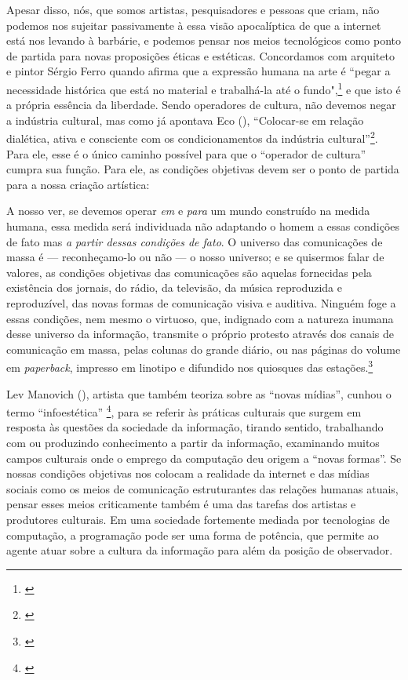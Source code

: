Apesar disso, nós, que somos artistas, pesquisadores e pessoas que criam, não podemos nos sujeitar passivamente à essa visão apocalíptica de que a internet está nos levando à barbárie, e podemos pensar nos meios tecnológicos como ponto de partida para novas proposições éticas e estéticas. Concordamos com arquiteto e pintor Sérgio Ferro quando afirma que a expressão humana na arte é ``pegar a necessidade histórica que está no material e trabalhá-la até o fundo",\footnote{\cite{FerroSergio2002}} e que isto é a própria essência da liberdade. Sendo operadores de cultura, não devemos negar a indústria cultural, mas como já apontava Eco (\citeyear{Eco1970}), ``Colocar-se em relação dialética, ativa e consciente com os condicionamentos da indústria cultural''\footnote{\cite[p. 14]{Eco1970}}. Para ele, esse é o único caminho possível para que o ``operador de cultura'' cumpra sua função. Para ele, as condições objetivas devem ser o ponto de partida para a nossa criação artística: 



\begin{citacao}
A nosso ver, se devemos operar \emph{em} e \emph{para} um mundo construído na medida humana, essa medida será individuada não adaptando o homem a essas condições de fato mas \emph{a partir dessas condições de fato}. O universo das comunicações de massa é --- reconheçamo-lo ou não --- o nosso universo; e se quisermos falar de valores, as condições objetivas das comunicações são aquelas fornecidas pela existência dos jornais, do rádio, da televisão, da música reproduzida e reproduzível, das novas formas de comunicação visiva e auditiva. Ninguém foge a essas condições, nem mesmo o virtuoso, que, indignado com a natureza inumana desse universo da informação, transmite o próprio protesto através dos canais de comunicação em massa, pelas colunas do grande diário, ou nas páginas do volume em \emph{paperback}, impresso em linotipo e difundido nos quiosques das estações.\footnote{\cite[p. 13]{Eco1970}}

\end{citacao}

 Lev Manovich (\citeyear{Manovich2008}), artista que também teoriza sobre as ``novas mídias'', cunhou o termo ``infoestética'' \footnote{\cite{Manovich2008}}, para se referir às práticas culturais que surgem em resposta às questões da sociedade da informação, tirando sentido, trabalhando com ou produzindo conhecimento a partir da informação, examinando muitos campos culturais onde o emprego da computação deu origem a ``novas formas''. Se nossas condições objetivas nos colocam a realidade da internet e das mídias sociais como os meios de comunicação estruturantes das relações humanas atuais, pensar esses meios criticamente também é uma das tarefas dos artistas e produtores culturais. Em uma sociedade fortemente mediada por tecnologias de computação, a programação pode ser uma forma de potência, que permite ao agente atuar sobre a cultura da informação para além da posição de observador.

